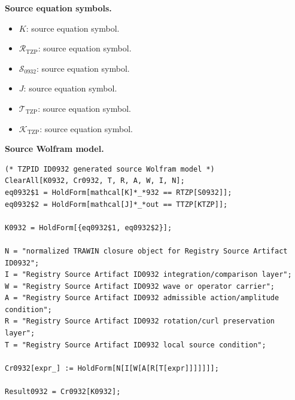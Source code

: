 \begin{minipage}[t]{0.49\linewidth}
\begingroup
\small
\raggedright
\textbf{Source equation symbols.}\par
\begin{itemize}[leftmargin=1.35em,itemsep=1pt,topsep=1pt,parsep=0pt]
    \item $K$: source equation symbol.
    \item $\mathcal{R}_{\mathrm{TZP}}$: source equation symbol.
    \item $\mathcal{S}_{0932}$: source equation symbol.
    \item $J$: source equation symbol.
    \item $\mathcal{T}_{\mathrm{TZP}}$: source equation symbol.
    \item $\mathcal{K}_{\mathrm{TZP}}$: source equation symbol.
\end{itemize}
\endgroup
\end{minipage}\hfill
\begin{minipage}[t]{0.47\linewidth}
\begingroup
\scriptsize
\raggedright
\textbf{Source Wolfram model.}\par
\begin{Verbatim}[fontsize=\tiny,breaklines=true,breakanywhere=true]
(* TZPID ID0932 generated source Wolfram model *)
ClearAll[K0932, Cr0932, T, R, A, W, I, N];
eq0932$1 = HoldForm[mathcal[K]*_*932 == RTZP[S0932]];
eq0932$2 = HoldForm[mathcal[J]*_*out == TTZP[KTZP]];

K0932 = HoldForm[{eq0932$1, eq0932$2}];

N = "normalized TRAWIN closure object for Registry Source Artifact ID0932";
I = "Registry Source Artifact ID0932 integration/comparison layer";
W = "Registry Source Artifact ID0932 wave or operator carrier";
A = "Registry Source Artifact ID0932 admissible action/amplitude condition";
R = "Registry Source Artifact ID0932 rotation/curl preservation layer";
T = "Registry Source Artifact ID0932 local source condition";

Cr0932[expr_] := HoldForm[N[I[W[A[R[T[expr]]]]]]];

Result0932 = Cr0932[K0932];
\end{Verbatim}
\endgroup
\end{minipage}

